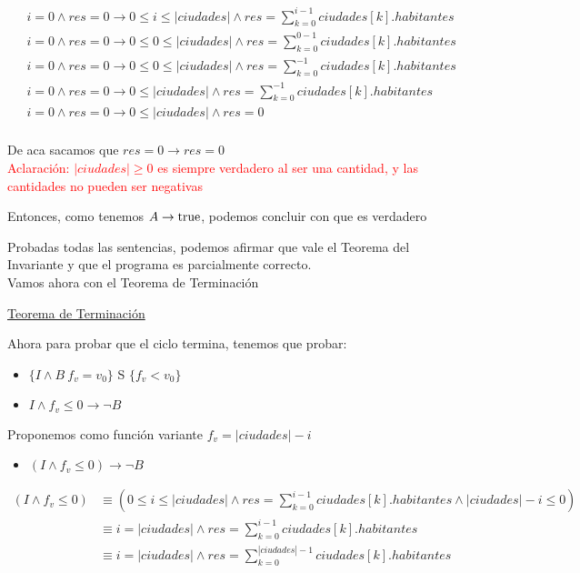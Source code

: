 \documentclass[10pt,a4paper]{article}
\begin{document}
\begin {enumerate}
    \begin{align*}
        &i = 0 \land res = 0 \to 0 \leq i \leq |ciudades| \land res = \sum\limits_{k=0}^{i - 1}{ciudades[k].habitantes} \\
        &i = 0 \land res = 0 \to 0 \leq 0 \leq |ciudades| \land res = \sum\limits_{k=0}^{0 - 1}{ciudades[k].habitantes} \\
        &i = 0 \land res = 0 \to 0 \leq 0 \leq |ciudades| \land res = \sum\limits_{k=0}^{-1}{ciudades[k].habitantes} \\
        &i = 0 \land res = 0 \to  0 \leq |ciudades| \land res = \sum\limits_{k=0}^{-1}{ciudades[k].habitantes} \\
        &i = 0 \land res = 0 \to  0 \leq |ciudades| \land res = 0 \\
    \end{align*}

    De aca sacamos que $res = 0 \to res = 0$ \\
    \textcolor{red}{Aclaración: $|ciudades| \geq 0$ es siempre verdadero al ser una cantidad, y las cantidades no pueden ser negativas}

    Entonces, como tenemos $A \to \mathrm{true}$, podemos concluir con que es verdadero

    Probadas todas las sentencias, podemos afirmar que vale el Teorema del Invariante y que el programa es parcialmente correcto.\\
    Vamos ahora con el Teorema de Terminación

    \underline{Teorema de Terminación}




    Ahora para probar que el ciclo termina, tenemos que probar:

    \begin{itemize}
        \item $\{ I \land B \ f_{v} = v_{0}  \}$ S $\{f_{v} < v_{0}\}$  
        \item $ I \land f_{v} \leq 0 \to \neg B$
    \end{itemize}

    Proponemos como función variante $f_{v} = |ciudades| - i$

    \begin{itemize}
        \item 
            $(I \land f_{v} \leq 0) \to \neg B$
    \end{itemize}

    \begin{align*}
        (I \land f_{v} \leq 0) &\equiv (0 \leq i \leq |ciudades| \land res = \sum\limits_{k=0}^{i -1}{ciudades[k].habitantes} \land |ciudades| - i \leq 0) \\
        &\equiv i = |ciudades| \land res = \sum\limits_{k=0}^{i -1}{ciudades[k].habitantes} \\
        &\equiv i = |ciudades| \land res = \sum\limits_{k=0}^{|ciudades| -1}{ciudades[k].habitantes}
    \end{align*}



\end{enumerate}
\end{document}
